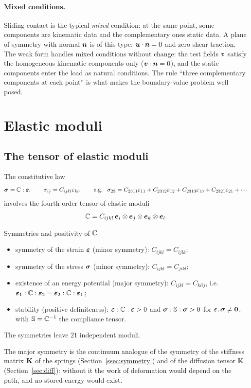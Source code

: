 \paragraph{Mixed conditions.}
%
Sliding contact is the typical \emph{mixed} condition: at the same point, some
components are kinematic data and the complementary ones static data. A plane
of symmetry with normal $\bm{n}$ is of this type: $\bm{u}\cdot\bm{n}=0$ and zero shear
traction. The weak form handles mixed conditions without change: the test
fields $\bm{v}$ satisfy the homogeneous kinematic components only ($\bm{v}\cdot\bm{n}=0$),
and the static components enter the load as natural conditions. The rule
``three complementary components at each point'' is what makes the
boundary-value problem well posed.

\section{Elastic moduli}\label{sec:el-moduli}
\subsection{The tensor of elastic moduli}
%
The constitutive law
\[
  \sig=\bbC:\eps,\qquad \sigma_{ij}=C_{ijkl}\varepsilon_{kl},
  \qquad\text{e.g. }\ \sigma_{23}=C_{2311}\varepsilon_{11}+C_{2312}\varepsilon_{12}
  +C_{2313}\varepsilon_{13}+C_{2321}\varepsilon_{21}+\cdots
\]
involves the fourth-order tensor of elastic moduli
\[
  \mathbb{C}=C_{ijkl}\,\bm{e}_i\otimes\bm{e}_j\otimes\bm{e}_k\otimes\bm{e}_l .
\]
\begin{gbox}{Symmetries and positivity of $\mathbb{C}$}
\begin{itemize}
  \item symmetry of the strain $\bm{\varepsilon}$ (minor symmetry): $C_{ijkl}=C_{ijlk}$;
  \item symmetry of the stress $\bm{\sigma}$ (minor symmetry): $C_{ijkl}=C_{jikl}$;
  \item existence of an energy potential (major symmetry): $C_{ijkl}=C_{klij}$,
  i.e.\ $\bm{\varepsilon}_1:\mathbb{C}:\bm{\varepsilon}_2=\bm{\varepsilon}_2:\mathbb{C}:\bm{\varepsilon}_1$;
  \item stability (positive definiteness):
  $\bm{\varepsilon}:\mathbb{C}:\bm{\varepsilon}>0$ and $\bm{\sigma}:\mathbb{S}:\bm{\sigma}>0$ for $\bm{\varepsilon},\bm{\sigma}\neq\bm{0}$,
  with $\mathbb{S}=\mathbb{C}^{-1}$ the compliance tensor.
\end{itemize}
The symmetries leave $21$ independent moduli.
\end{gbox}
The major symmetry is the continuum analogue of the symmetry of the stiffness
matrix $\mathbf{K}$ of the springs (Section~\ref{ssec:symmetry}) and of the
diffusion tensor $\mathbb{K}$ (Section~\ref{sec:diff}): without it the work of deformation would depend
on the path, and no stored energy would exist.

